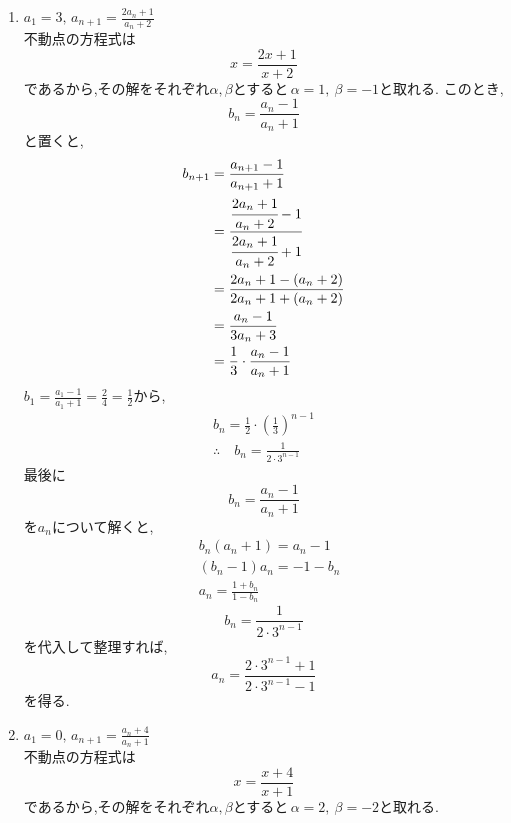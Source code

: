     \noindent{}
    \begin{enumerate}[label=(\arabic*),parsep=3pt,format=\bookitemlink{example-fractional-2}{solution}{problem}]
      \item $\displaystyle a_1=3,\, a_{n+1}=\frac{2a_n+1}{a_n+2}$\\
            不動点の方程式は
            \[
              x=\frac{2x+1}{x+2}
            \]
            であるから,その解をそれぞれ$\alpha,\beta$とすると\,$\alpha=1,\ \beta=-1$と取れる.
            このとき,
            \[
              b_n=\frac{a_n-1}{a_n+1}
            \]
            と置くと,
            \begin{align*}
              b_{n+1}&=\frac{a_{n+1}-1}{a_{n+1}+1}\\
              &=\cfrac{\cfrac{2a_n+1}{a_n+2}-1}{\cfrac{2a_n+1}{a_n+2}+1}\\
              &=\frac{2a_n+1-(a_n+2)}{2a_n+1+(a_n+2)}\\
              &=\frac{a_n-1}{3a_n+3}\\
              &=\frac{1}{3}\cdot \frac{a_n-1}{a_n+1}
            \end{align*}
            $\displaystyle b_1=\frac{a_1-1}{a_1+1}=\frac{2}{4}=\frac{1}{2}$から,
            \begin{align*}
              b_{n}=\frac{1}{2}\cdot\left(\frac{1}{3}\right)^{n-1}\\
              \therefore \quad b_n=\frac{1}{2\cdot3^{n-1}}
            \end{align*}
            最後に
            \[
              b_n=\frac{a_n-1}{a_n+1}
            \]
            を$a_n$について解くと,
            \begin{align*}
              &b_n(a_n+1)=a_n-1\\
              &(b_n-1)a_n=-1-b_n\\
              &a_n=\frac{1+b_n}{1-b_n}
            \end{align*}
            \[
              b_n=\frac{1}{2\cdot3^{n-1}}
            \]
            を代入して整理すれば,
            \[
              a_n=\frac{2\cdot3^{n-1}+1}{2\cdot3^{n-1}-1}
            \]
            を得る.
      \item $\displaystyle a_1=0,\, a_{n+1}=\frac{a_n+4}{a_n+1}$\\
            不動点の方程式は
            \[
              x=\frac{x+4}{x+1}
            \]
            であるから,その解をそれぞれ$\alpha,\beta$とすると\,$\alpha=2,\ \beta=-2$と取れる.

\end{enumerate}
